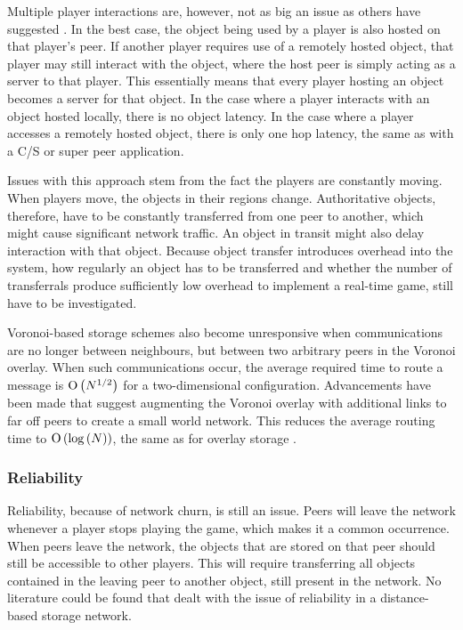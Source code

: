 Multiple player interactions are, however, not as big an issue as others have suggested \cite{Fan_deisgn_issues_p2p}. In the best case, the object being used by a player is also hosted on that player's peer. If another player requires use of a remotely hosted object, that player may still interact with the object, where the host peer is simply acting as a server to that player. This essentially means that every player hosting an object becomes a server for that object. In the case where a player interacts with an object hosted locally, there is no object latency. In the case where a player
accesses a remotely hosted object, there is only one hop latency, the same as with a C/S or super peer application.

Issues with this approach stem from the fact the players are constantly moving. When players move, the objects in their regions change. Authoritative objects, therefore, have to be constantly transferred from one peer to another, which might cause significant network traffic. An object in transit might also delay interaction with that object. Because object transfer introduces overhead into the system, how regularly an object has to be transferred and whether the number of transferrals produce sufficiently low overhead to implement a real-time game, still have to be investigated.

Voronoi-based storage schemes also become unresponsive when communications are no longer between neighbours, but between two arbitrary peers in the
Voronoi overlay. When such communications occur, the average required time to route a message is $\operatorname{O}\left(N^{1/2}\right)$ for a two-dimensional configuration.
Advancements have been made that suggest augmenting the Voronoi overlay with additional links to far off peers to create a small world network. This
reduces the average routing time to $\operatorname{O}\left(\log{(N)}\right)$, the same as for overlay storage \cite{Steiner_voronoi_shortcuts}.

\subsubsection{Reliability}

Reliability, because of network churn, is still an issue. Peers will leave the network whenever a player stops playing the game, which makes it a common occurrence. When peers leave the network, the objects that are stored on that peer should still be accessible to other players. This will require transferring all objects contained in the leaving peer to another object, still present in the network. No literature could be found that dealt with the issue of reliability in a distance-based storage network.

